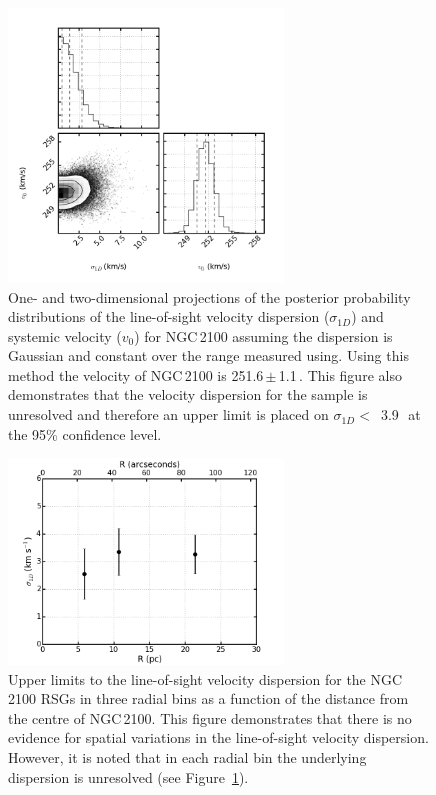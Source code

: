 \begin{figure}
\centering
 \includegraphics[width=0.65\textwidth]{ngc2100/NGC2100-sigRV-triangle}
 \caption[One- and two-dimensional projections of $\sigma_{1D}$ and $v_{0}$]{One- and two-dimensional projections of the posterior probability distributions of the line-of-sight velocity dispersion ($\sigma_{1D}$) and systemic velocity ($v_{0}$) for NGC\,2100 assuming the dispersion is Gaussian and constant over the range measured using.
 Using this method the velocity of NGC\,2100 is 251.6\,$\pm$\,1.1\,\kms.
 This figure also demonstrates that the velocity dispersion for the sample is unresolved and therefore an upper limit is placed on $\sigma_{1D} <$~3.9\,\kms~at the 95\% confidence level.
\label{fig:sig1d}
          }
\end{figure}

\begin{figure}
\centering
 \includegraphics[width=0.65\textwidth]{ngc2100/NGC2100-sig1d-bins}
 \caption[$\sigma_{1D}$ as a function of radial distance from the cluster centre]{Upper limits to the line-of-sight velocity dispersion for the NGC\,2100 RSGs in three radial bins as a function of the distance from the centre of NGC\,2100.
 This figure demonstrates that there is no evidence for spatial variations in the line-of-sight velocity dispersion.
 However, it is noted that in each radial bin the underlying dispersion is unresolved (see Figure~\ref{fig:sig1d}).
\label{fig:sig1dbins}
          }
\end{figure}

